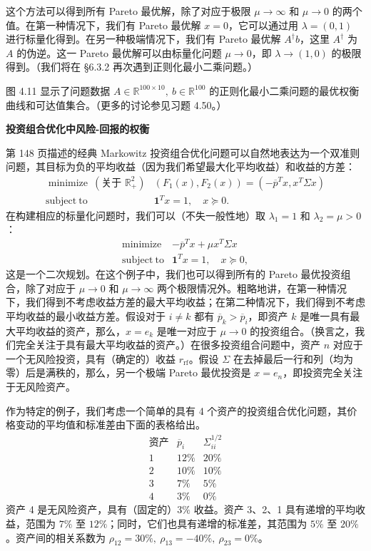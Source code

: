 \documentclass[UTF8,12pt,a4paper,fontset=fandol]{ctexart}
\begin{document}
这个方法可以得到所有 Pareto 最优解，除了对应于极限 $\mu\to\infty$ 和 $\mu\to 0$ 的两个值。在第一种情况下，我们有 Pareto 最优解 $x=0$，它可以通过用 $\lambda=(0,1)$ 进行标量化得到。在另一种极端情况下，我们有 Pareto 最优解 $A^\dagger b$，这里 $A^\dagger$ 为 $A$ 的伪逆。这一 Pareto 最优解可以由标量化问题 $\mu\to 0$，即 $\lambda\to(1,0)$ 的极限得到。（我们将在 \S 6.3.2 再次遇到正则化最小二乘问题。）

图 4.11 显示了问题数据 $A\in\mathbb{R}^{100\times 10},\ b\in\mathbb{R}^{100}$ 的正则化最小二乘问题的最优权衡曲线和可达值集合。（更多的讨论参见习题 4.50。）

\noindent\textbf{投资组合优化中风险-回报的权衡}

第 148 页描述的经典 Markowitz 投资组合优化问题可以自然地表达为一个双准则问题，其目标为负的平均收益（因为我们希望最大化平均收益）和收益的方差：
\[
\begin{array}{ll}
\mathop{\mathrm{minimize}}\ (\text{关于 }\mathbb{R}_+^2) & (F_1(x),F_2(x))=(-\overline{p}^Tx,x^T\Sigma x)\\
\mathrm{subject\ to} & \mathbf{1}^Tx=1,\quad x\succeq 0.
\end{array}
\]
在构建相应的标量化问题时，我们可以（不失一般性地）取 $\lambda_1=1$ 和 $\lambda_2=\mu>0$：
\[
\begin{array}{ll}
\mathop{\mathrm{minimize}} & -\overline{p}^Tx+\mu x^T\Sigma x\\
\mathrm{subject\ to} & \mathbf{1}^Tx=1,\quad x\succeq 0,
\end{array}
\]
这是一个二次规划。在这个例子中，我们也可以得到所有的 Pareto 最优投资组合，除了对应于 $\mu\to 0$ 和 $\mu\to\infty$ 两个极限情况外。粗略地讲，在第一种情况下，我们得到不考虑收益方差的最大平均收益；在第二种情况下，我们得到不考虑平均收益的最小收益方差。假设对于 $i\neq k$ 都有 $\overline{p}_k>\overline{p}_i$，即资产 $k$ 是唯一具有最大平均收益的资产，那么，$x=e_k$ 是唯一对应于 $\mu\to 0$ 的投资组合。（换言之，我们完全关注于具有最大平均收益的资产。）在很多投资组合问题中，资产 $n$ 对应于一个无风险投资，具有（确定的）收益 $r_{\mathrm{rf}}$。假设 $\Sigma$ 在去掉最后一行和列（均为零）后是满秩的，那么，另一个极端 Pareto 最优投资是 $x=e_n$，即投资完全关注于无风险资产。

作为特定的例子，我们考虑一个简单的具有 4 个资产的投资组合优化问题，其价格变动的平均值和标准差由下面的表格给出。
\[
\begin{array}{c|cc}
\text{资产} & \overline{p}_i & \Sigma_{ii}^{1/2}\\
\hline
1 & 12\% & 20\%\\
2 & 10\% & 10\%\\
3 & 7\% & 5\%\\
4 & 3\% & 0\%
\end{array}
\]
资产 4 是无风险资产，具有（固定的）$3\%$ 收益。资产 3、2、1 具有递增的平均收益，范围为 $7\%$ 至 $12\%$；同时，它们也具有递增的标准差，其范围为 $5\%$ 至 $20\%$。资产间的相关系数为 $\rho_{12}=30\%,\ \rho_{13}=-40\%,\ \rho_{23}=0\%$。
\end{document}
